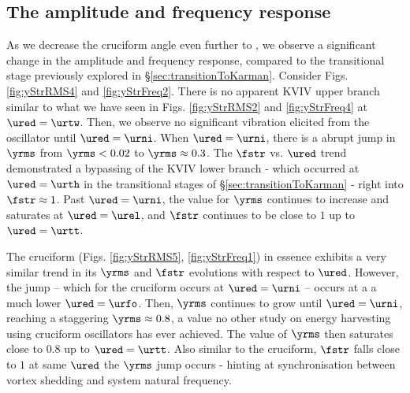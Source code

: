\documentclass[a4paper,fleqn]{cas-sc}
\begin{document}
\subsection{The amplitude and frequency response}\label{ssec:kvivAmpFreqResp}
As we decrease the cruciform angle even further to \angtw{}, we observe a significant change in the amplitude and frequency response, compared to the transitional stage previously explored in \S\ref{sec:transitionToKarman}. Consider Figs. \ref{fig:yStrRMS4} and \ref{fig:yStrFreq2}. There is no apparent KVIV upper branch similar to what we have seen in Figs. \ref{fig:yStrRMS2} and \ref{fig:yStrFreq4} at $\ured = \urtw$. Then, we observe no significant vibration elicited from the oscillator until $\ured = \urni$. When $\ured = \urni$, there is a abrupt jump in $\yrms$ from $\yrms < 0.02$ to $\yrms \approx 0.3$. The $\fstr$ vs. $\ured$ trend demonstrated a bypassing of the KVIV lower branch - which occurred at $\ured = \urth$ in the transitional stages of \S\ref{sec:transitionToKarman} - right into $\fstr \approx 1$. Past $\ured = \urni$, the value for $\yrms$ continues to increase and saturates at $\ured = \urel$, and $\fstr$ continues to be close to $1$ up to $\ured = \urtt$.

The \angon{} cruciform (Figs. \ref{fig:yStrRMS5}, \ref{fig:yStrFreq1}) in essence exhibits a very similar trend in its $\yrms$ and $\fstr$ evolutions with respect to $\ured$. However, the jump -- which for the \angtw{} cruciform occurs at $\ured = \urni$ -- occurs at a a much lower $\ured = \urfo$. Then, $\yrms$ continues to grow until $\ured = \urni$, reaching a staggering $\yrms \approx 0.8$, a value no other study on energy harvesting using cruciform oscillators has ever achieved. The value of $\yrms$ then saturates close to $0.8$ up to $\ured = \urtt$. Also similar to the \angtw{} cruciform, $\fstr$ falls close to $1$ at same $\ured$ the $\yrms$ jump occurs - hinting at synchronisation between vortex shedding and system natural frequency.
\end{document}
